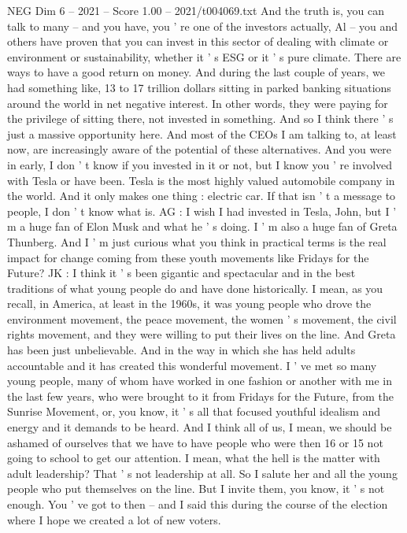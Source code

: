 \begin{textsample}{NEG Dim 6 – 2021 – Score 1.00 – 2021/t004069.txt}
And the truth is, you can talk to many -- and you have, you ' re one of the investors actually, Al -- you and others have proven that you can invest in this sector of dealing with climate or environment or sustainability, whether it ' s ESG or it ' s pure climate.
There are ways to have a good return on money.
And during the last couple of years, we had something like, 13 to 17 trillion dollars sitting in parked banking situations around the world in net negative interest.
In other words, they were paying for the privilege of sitting there, not invested in something.
And so I think there ' s just a massive opportunity here.
And most of the CEOs I am talking to, at least now, are increasingly aware of the potential of these alternatives.
And you were in early, I don ' t know if you invested in it or not, but I know you ' re involved with Tesla or have been.
Tesla is the most highly valued automobile company in the world.
And it only makes one thing : electric car.
If that isn ' t a message to people, I don ' t know what is.
AG : I wish I had invested in Tesla, John, but I ' m a huge fan of Elon Musk and what he ' s doing.
I ' m also a huge fan of Greta Thunberg.
And I ' m just curious what you think in practical terms is the real impact for change coming from these youth movements like Fridays for the Future?
JK : I think it ' s been gigantic and spectacular and in the best traditions of what young people do and have done historically.
I mean, as you recall, in America, at least in the 1960s, it was young people who drove the environment movement, the peace movement, the women ' s movement, the civil rights movement, and they were willing to put their lives on the line.
And Greta has been just unbelievable.
And in the way in which she has held adults accountable and it has created this wonderful movement.
I ' ve met so many young people, many of whom have worked in one fashion or another with me in the last few years, who were brought to it from Fridays for the Future, from the Sunrise Movement, or, you know, it ' s all that focused youthful idealism and energy and it demands to be heard.
And I think all of us, I mean, we should be ashamed of ourselves that we have to have people who were then 16 or 15 not going to school to get our attention.
I mean, what the hell is the matter with adult leadership?
That ' s not leadership at all.
So I salute her and all the young people who put themselves on the line.
But I invite them, you know, it ' s not enough.
You ' ve got to then -- and I said this during the course of the election where I hope we created a lot of new voters.

\end{textsample}
